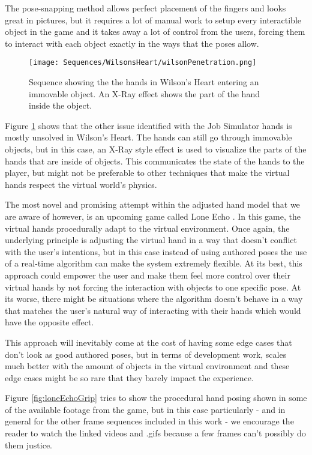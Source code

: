 The pose-snapping method allows perfect placement of the fingers and looks great in pictures, but it requires a lot of manual work to setup every interactible object in the game and it takes away a lot of control from the users, forcing them to interact with each object exactly in the ways that the poses allow.

\begin{figure}[H]
\centering
\texttt{[image: Sequences/WilsonsHeart/wilsonPenetration.png]}
\caption{Sequence showing the the hands in Wilson's Heart entering an immovable object. An X-Ray effect shows the part of the hand inside the object.}
\label{fig:wilsonPenetration}
\end{figure}

Figure \ref{fig:wilsonPenetration} shows that the other issue identified with the Job Simulator hands is mostly unsolved in Wilson's Heart. The hands can still go through immovable objects, but in this case, an X-Ray style effect is used to visualize the parts of the hands that are inside of objects. This communicates the state of the hands to the player, but might not be preferable to other techniques that make the virtual hands respect the virtual world's physics.

The most novel and promising attempt within the adjusted hand model that we are aware of however, is an upcoming game called Lone Echo \parencite{ReadyAtDawn}. In this game, the virtual hands procedurally adapt to the virtual environment. Once again, the underlying principle is adjusting the virtual hand in a way that doesn't conflict with the user's intentions, but in this case instead of using authored poses the use of a real-time algorithm can make the system extremely flexible. At its best, this approach could empower the user and make them feel more control over their virtual hands by not forcing the interaction with objects to one specific pose. At its worse, there might be situations where the algorithm doesn't behave in a way that matches the user's natural way of interacting with their hands which would have the opposite effect.

This approach will inevitably come at the cost of having some edge cases that don't look as good authored poses, but in terms of development work, scales much better with the amount of objects in the virtual environment and these edge cases might be so rare that they barely impact the experience.

Figure \ref{fig:loneEchoGrip} tries to show the procedural hand posing shown in some of the available footage from the game, but in this case particularly - and in general for the other frame sequences included in this work - we encourage the reader to watch the linked videos and .gifs because a few frames can't possibly do them justice.

